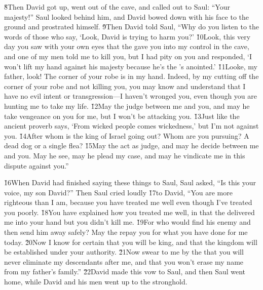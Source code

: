 \v{8}Then David got up, went out of the cave, and called out to Saul: ``Your majesty!'' Saul looked behind him, and David bowed down with his face to the ground and prostrated himself. \v{9}Then David told Saul, ``Why do you listen to the words of those who say, `Look, David is trying to harm you?' \v{10}Look, this very day you saw with your own eyes that the  gave you into my control in the cave, and one of my men told me to kill you, but I had pity on you and responded, `I won't lift my hand against his majesty because he's the 's anointed.' \v{11}Looke, my father, look! The corner of your robe is in my hand. Indeed, by my cutting off the corner of your robe and not killing you, you may know and understand that I have no evil intent or transgression---I haven't wronged you, even though you are hunting me to take my life. \v{12}May the  judge between me and you, and may he take vengeance on you for me, but I won't be attacking you. \v{13}Just like the ancient proverb says, `From wicked people comes wickedness,' but I'm not against you. \v{14}After whom is the king of Israel going out? Whom are you pursuing? A dead dog or a single flea? \v{15}May the  act as judge, and may he decide between me and you. May he see, may he plead my case, and may he vindicate me in this dispute against you.''

\v{16}When David had finished saying these things to Saul, Saul asked, ``Is this your voice, my son David?'' Then Saul cried loudly \v{17}to David, ``You are more righteous than I am, because you have treated me well even though I've treated you poorly. \v{18}You have explained how you treated me well, in that the  delivered me into your hand but you didn't kill me. \v{19}For who would find his enemy and then send him away safely? May the  repay you for what you have done for me today. \v{20}Now I know for certain that you will be king, and that the kingdom will be established under your authority. \v{21}Now swear to me by the  that you will never eliminate my descendants after me, and that you won't erase my name from my father's family.'' \v{22}David made this vow to Saul, and then Saul went home, while David and his men went up to the stronghold.

